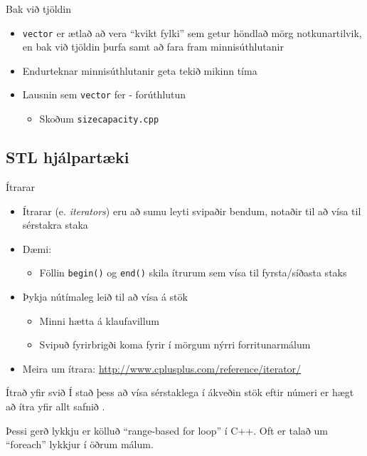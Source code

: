 \documentclass{beamer}
\begin{document}
\begin{frame}{Bak við tjöldin}
	\begin{itemize}
		\item \texttt{vector} er ætlað að vera ``kvikt fylki'' sem getur höndlað mörg notkunartilvik, en bak við tjöldin þurfa samt að fara fram minnisúthlutanir
		\item Endurteknar minnisúthlutanir geta tekið mikinn tíma
		\item Lausnin sem \texttt{vector} fer - forúthlutun
		      \begin{itemize}
			      \item Skoðum \texttt{sizecapacity.cpp}
		      \end{itemize}
	\end{itemize}
\end{frame}

\subsection{STL hjálpartæki}

\begin{frame}{Ítrarar}
	\begin{itemize}
		\item Ítrarar (e. \emph{iterators}) eru að sumu leyti svipaðir bendum, notaðir til að vísa til sérstakra staka
		\item Dæmi:
		      \begin{itemize}
			      \item Föllin \texttt{begin()} og \texttt{end()} skila ítrurum sem vísa til fyrsta/síðasta staks
		      \end{itemize}
		\item Þykja nútímaleg leið til að vísa á stök
		      \begin{itemize}
			      \item Minni hætta á klaufavillum
			      \item Svipuð fyrirbrigði koma fyrir í mörgum nýrri forritunarmálum
		      \end{itemize}
		\item Meira um ítrara: \url{http://www.cplusplus.com/reference/iterator/}
	\end{itemize}
\end{frame}

\begin{frame}[fragile]{Ítrað yfir svið}
	Í stað þess að vísa sérstaklega í ákveðin stök eftir númeri er hægt að ítra yfir allt safnið .


	Þessi gerð lykkju er kölluð ``range-based for loop'' í C++. Oft er talað um ``foreach'' lykkjur í öðrum málum.
\end{frame}
\end{document}
